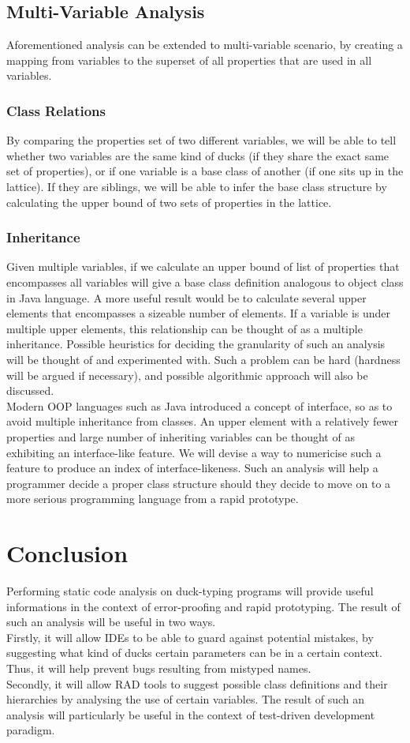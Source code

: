 \documentclass[a4paper,12pt]{article}
\begin{document}
\subsection{Multi-Variable Analysis}
Aforementioned analysis can be extended to multi-variable scenario, by creating a mapping from variables to the superset of all properties that are used in all variables.
\subsubsection{Class Relations}
By comparing the properties set of two different variables, we will be able to tell whether two variables are the same kind of ducks (if they share the exact same set of properties), or if one variable is a base class of another (if one sits up in the lattice). If they are siblings, we will be able to infer the base class structure by calculating the upper bound of two sets of properties in the lattice.
\subsubsection{Inheritance}
Given multiple variables, if we calculate an upper bound of list of properties that encompasses all variables will give a base class definition analogous to object class in Java language. A more useful result would be to calculate several upper elements that encompasses a sizeable number of elements. If a variable is under multiple upper elements, this relationship can be thought of as a multiple inheritance. Possible heuristics for deciding the granularity of such an analysis will be thought of and experimented with. Such a problem can be hard (hardness will be argued if necessary), and possible algorithmic approach will also be discussed.\\
Modern OOP languages such as Java introduced a concept of interface, so as to 
avoid multiple inheritance from classes. An upper element with a relatively 
fewer properties and large number of inheriting variables can be thought of 
as exhibiting an interface-like feature. We will devise a way to numericise 
such a feature to produce an index of interface-likeness. Such an analysis 
will help a programmer decide a proper class structure should they decide to 
move on to a more serious programming language from a rapid prototype.
\section{Conclusion}
Performing static code analysis on duck-typing programs will provide useful 
informations in the context of error-proofing and rapid prototyping. The 
result of such an analysis will be useful in two ways.\\ 
Firstly, it will allow IDEs to be able to guard against potential mistakes, 
by suggesting what kind of ducks certain parameters can be in a certain 
context. Thus, it will help prevent bugs resulting from mistyped names.\\
Secondly, it will allow RAD tools to suggest possible class definitions and 
their hierarchies by analysing the use of certain variables. The result of 
such an analysis will particularly be useful in the context of test-driven 
development paradigm.\\
\end{document}
